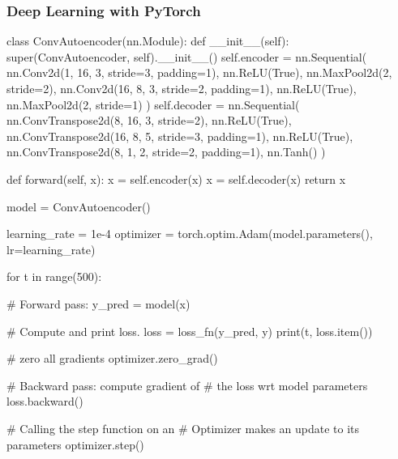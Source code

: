 \documentclass{beamer}
\begin{document}
\begin{frame}[fragile]\frametitle{Deep Learning with PyTorch} 
    \begin{pythoncode}
    class ConvAutoencoder(nn.Module):
        def __init__(self):
            super(ConvAutoencoder, self).__init__()
            self.encoder = nn.Sequential(
                nn.Conv2d(1, 16, 3, stride=3, padding=1),
                nn.ReLU(True),
                nn.MaxPool2d(2, stride=2),
                nn.Conv2d(16, 8, 3, stride=2, padding=1),
                nn.ReLU(True),
                nn.MaxPool2d(2, stride=1)
            )
            self.decoder = nn.Sequential(
                nn.ConvTranspose2d(8, 16, 3, stride=2),
                nn.ReLU(True),
                nn.ConvTranspose2d(16, 8, 5, stride=3, padding=1),
                nn.ReLU(True),
                nn.ConvTranspose2d(8, 1, 2, stride=2, padding=1),
                nn.Tanh()
            )

        def forward(self, x):
            x = self.encoder(x)
            x = self.decoder(x)
            return x
    \end{pythoncode}
    model = ConvAutoencoder()
\end{frame}

\begin{frame}[fragile ]
\begin{pythoncode}
learning_rate = 1e-4
optimizer = torch.optim.Adam(model.parameters(), lr=learning_rate)

for t in range(500):

  # Forward pass: 
  y_pred = model(x)

  # Compute and print loss.
  loss = loss_fn(y_pred, y)
  print(t, loss.item())
  
  # zero all gradients
  optimizer.zero_grad()

  # Backward pass: compute gradient of 
  # the loss wrt model parameters
  loss.backward()

  # Calling the step function on an 
  # Optimizer makes an update to its parameters
  optimizer.step()
\end{pythoncode}
\end{frame}
\end{document}
